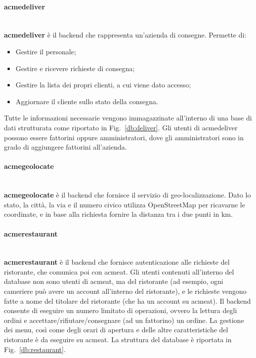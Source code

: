 \documentclass[11pt]{article} %
\begin{document}
\paragraph{acmedeliver}\mbox{}\\
\textbf{acmedeliver} è il backend che rappresenta un'azienda di consegne. Permette di:
\begin{itemize}
\item Gestire il personale;
\item Gestire e ricevere richieste di consegna;
\item Gestire la lista dei propri clienti, a cui viene dato accesso;
\item Aggiornare il cliente sullo stato della consegna.
\end{itemize}
Tutte le informazioni necessarie vengono immagazzinate all'interno di una base di dati strutturata come riportato in Fig.~\ref{db:deliver}. Gli utenti di acmedeliver possono essere fattorini oppure amministratori, dove gli amministratori sono in grado di aggiungere fattorini all'azienda.

\paragraph{acmegeolocate}\mbox{}\\
\textbf{acmegeolocate} è il backend che fornisce il servizio di geo-localizzazione. Dato lo stato, la città, la via e il numero civico utilizza OpenStreetMap per ricavarne le coordinate, e in base alla richiesta fornire la distanza tra i due punti in km.

\paragraph{acmerestaurant}\mbox{}\\
\textbf{acmerestaurant} è il backend che fornisce autenticazione alle richieste del ristorante, che comunica poi con acmeat. Gli utenti contenuti all'interno del database non sono utenti di acmeat, ma del ristorante (ad esempio, ogni cameriere può avere un account all'interno del ristorante), e le richieste vengono fatte a nome del titolare del ristorante (che ha un account su acmeat). Il backend consente di eseguire un numero limitato di operazioni, ovvero la lettura degli ordini e accettare/rifiutare/consegnare (ad un fattorino) un ordine. La gestione dei menu, così come degli orari di apertura e delle altre caratteristiche del ristorante è da eseguire su acmeat. La struttura del database è riportata in Fig.~\ref{db:restaurant}.
\end{document}
